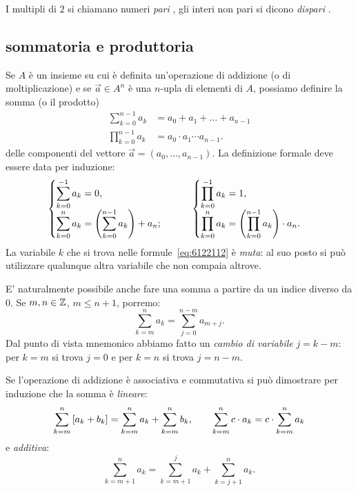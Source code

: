 I multipli di $2$ si chiamano numeri \emph{pari}%
%
,
gli interi non pari si dicono \emph{dispari}%
%
. 

\subsection{sommatoria e produttoria}
%
%

Se $A$ è un insieme su cui è definita un'operazione di addizione 
(o di moltiplicazione) e se $\vec a \in A^n$ 
è una $n$-upla di elementi di $A$, 
possiamo definire la somma (o il prodotto)
\begin{equation}
  \label{eq:6122112}
  \begin{aligned}
  \sum_{k=0}^{n-1} a_k &= a_0 + a_1 + \dots + a_{n-1} \\
  \prod_{k=0}^{n-1} a_k &= a_0 \cdot a_1 \cdots a_{n-1}.
  \end{aligned}
\end{equation}
delle componenti del vettore $\vec a = (a_0, \dots, a_{n-1})$.
La definizione formale deve essere data per induzione:
\[
  \begin{cases}
    \displaystyle\sum_{k=0}^{-1} a_k = 0, \\
    \displaystyle\sum_{k=0}^{n} a_k = {\left( \sum_{k=0}^{n-1} a_k \right)} + a_n;
  \end{cases}  \qquad
  \begin{cases}
    \displaystyle\prod_{k=0}^{-1} a_k = 1, \\
    \displaystyle\prod_{k=0}^{n} a_k = {\left( \prod_{k=0}^{n-1} a_k \right)} \cdot a_n.
  \end{cases}
\]
La variabile $k$ che si trova nelle formule~\eqref{eq:6122112} è \emph{muta}: 
al suo posto si può utilizzare qualunque altra variabile che non
compaia altrove.

E' naturalmente possibile anche fare una somma a partire da un indice 
diverso da $0$. Se $m,n\in {\mathbb Z}$, $m\le n+1$, porremo:
\[
  \sum_{k=m}^n a_k = \sum_{j=0}^{n-m} a_{m+j}.
\]
Dal punto di vista mnemonico abbiamo fatto 
un \emph{cambio di variabile} $j=k-m$:
per $k=m$ si trova $j=0$ e per $k=n$ si trova $j=n-m$.

\begin{exercise}
  Se l'operazione di addizione è associativa e commutativa
  si può dimostrare per induzione che 
  la somma è \emph{lineare}:
  \[
  \sum_{k=m}^n  {\left[ a_k + b_k \right]} 
  = \sum_{k=m}^n a_k + \sum_{k=m}^n b_k, 
  \qquad
  \sum_{k=m}^n c\cdot a_k 
  =c\cdot \sum_{k=m}^n a_k
  \]
  e \emph{additiva}:
  \[
    \sum_{k=m+1}^n a_k = \sum_{k=m+1}^j a_k + \sum_{k=j+1}^n a_k.  
  \]
\end{exercise}

